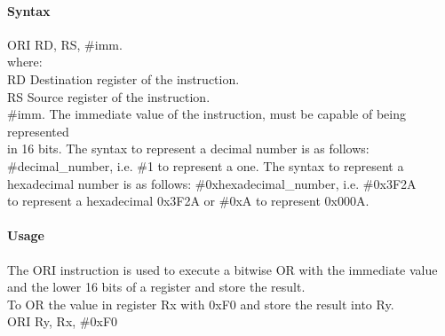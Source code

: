 \documentclass[12pt]{article}
\begin{document}
    \paragraph{Syntax}
    \begin{flushleft}
    ORI RD, RS, \#imm.\\
    \vspace{1em}        %
    where:\\
    \vspace{1em}
    RD  \hspace{3.6em} Destination register of the instruction.\\
    \vspace{1em}
    RS  \hspace{3.85em} Source register of the instruction.\\
    \vspace{1em}
    \#imm.  \hspace{1.8em} The immediate value of the instruction, must be capable of being represented\\             \hspace{5.4em} in 16 bits. The syntax to represent a decimal number is as follows:\\
            \hspace{5.4em} \#decimal\_number, i.e. \#1 to represent a one. The syntax to represent a\\
            \hspace{5.4em} hexadecimal number is as follows: \#0xhexadecimal\_number, i.e. \#0x3F2A \\
            \hspace{5.4em} to represent a hexadecimal 0x3F2A or \#0xA to represent 0x000A.\\
    \end{flushleft}
    
    \paragraph{Usage}
    \begin{flushleft}
    The ORI instruction is used to execute a bitwise OR with the immediate value and the lower 16 bits of a register and store the result.\\    
    \vspace{1em}
    To OR the value in register Rx with 0xF0 and store the result into Ry.\\
    \vspace{1em}
    ORI Ry, Rx, \#0xF0
    \end{flushleft}
    
\end{document}
